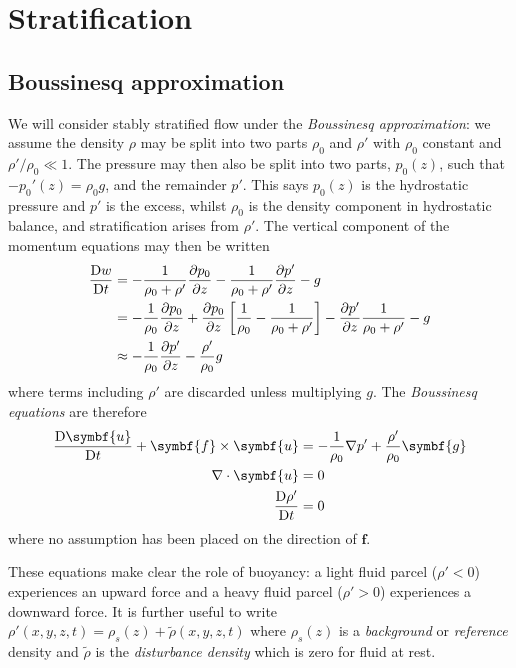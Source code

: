 \documentclass{jknotes}
\begin{document}
\section{Stratification}
\subsection{Boussinesq approximation}
We will consider stably stratified flow under the \emph{Boussinesq
approximation}: we assume the density $\rho$ may be split into two parts
$\rho_0$ and $\rho'$ with $\rho_0$ constant and $\rho'/\rho_0 \ll 1$. The
pressure may then also be split into two parts, $p_0(z)$, such that
$-p_0'(z) = \rho_0 g$, and the remainder $p'$. This says $p_0(z)$ is the
hydrostatic pressure and $p'$ is the excess, whilst $\rho_0$ is the density
component in hydrostatic balance, and stratification arises from $\rho'$. The
vertical component of the momentum equations may then be written
\begin{align}
	\frac{\mathrm{D} w}{\mathrm{D} t} &= -\frac{1}{\rho_0 + \rho'}\frac{\partial
		p_0}{\partial z} - \frac{1}{\rho_0 + \rho'} \frac{\partial
	p'}{\partial z} - g \\
	&= -\frac{1}{\rho_0} \frac{\partial p_0}{\partial z} + \frac{\partial
p_0}{\partial z} \left[ \frac{1}{\rho_0} - \frac{1}{\rho_0 + \rho'}\right] -
\frac{\partial p'}{\partial z} \frac{1}{\rho_0 + \rho'} - g \\
&\approx -\frac{1}{\rho_0} \frac{\partial p'}{\partial z} -
\frac{\rho'}{\rho_0} g
\end{align}
where terms including $\rho'$ are discarded unless multiplying $g$. The
\emph{Boussinesq equations} are therefore
\begin{align}
	\frac{\diffD \symbf{u}}{\diffD t} + \symbf{f} \times \symbf{u} &= -\frac{1}{\rho_0} \nabla
	p' + \frac{\rho'}{\rho_0}\symbf{g} \\
	\nabla \cdot \symbf{u} &= 0 \\
	\frac{\diffD \rho'}{\diffD t} &= 0
\end{align}
where no assumption has been placed on the direction of $\symbf{f}$. 

These equations make clear the role of buoyancy: a light fluid parcel ($\rho'
<0$) experiences an upward force and a heavy fluid parcel ($\rho' > 0$)
experiences a downward force. It is further useful to write $\rho'(x,y,z,t) =
\rho_s (z) + \tilde{\rho}(x,y,z,t)$ where $\rho_s(z)$ is a \emph{background}
or \emph{reference} density and $\tilde{\rho}$ is the \emph{disturbance
density} which is zero for fluid at rest.
\end{document}
